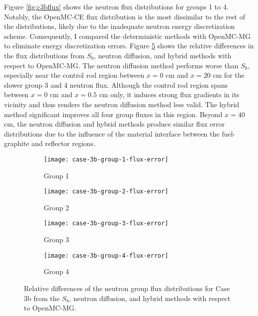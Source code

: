 Figure \ref{fig:c3bflux} shows the neutron flux distributions for groups 1 to 4. Notably, the
OpenMC-CE flux distribution is the most dissimilar to the rest of the distributions, likely due to
the inadequate neutron energy discretization scheme. Consequently, I compared the
deterministic methods with OpenMC-MG to eliminate energy discretization errors. Figure
\ref{fig:c3bfluxe} shows the relative differences in the flux distributions from $S_8$, neutron
diffusion, and hybrid methods with respect to OpenMC-MG. The neutron diffusion method
performs worse than $S_8$, especially near the control rod region between $x=0$ cm and $x=20$ cm
for the slower group 3 and 4 neutron flux. Although the control rod region spans between $x=0$ cm
and $x=0.5$ cm only, it induces strong flux gradients in its vicinity and thus renders the neutron
diffusion method less valid. The hybrid method significant improves all four
group fluxes in this region. Beyond $x=40$ cm, the neutron diffusion and hybrid methods produce
similar flux error distributions due to the influence of the material interface between the
fuel-graphite and reflector regions.

\begin{figure}[htb!]
  \centering
  \begin{subfigure}[t]{.49\textwidth}
    \centering
    \texttt{[image: case-3b-group-1-flux-error]}
    \caption{Group 1}
    \label{fig:c3bg1e}
  \end{subfigure}
  \hfill
  \begin{subfigure}[t]{.49\textwidth}
    \centering
    \texttt{[image: case-3b-group-2-flux-error]}
    \caption{Group 2}
    \label{fig:c3bg2e}
  \end{subfigure}
  \begin{subfigure}[t]{.49\textwidth}
    \centering
    \texttt{[image: case-3b-group-3-flux-error]}
    \caption{Group 3}
    \label{fig:c3bg3e}
  \end{subfigure}
  \hfill
  \begin{subfigure}[t]{.49\textwidth}
    \centering
    \texttt{[image: case-3b-group-4-flux-error]}
    \caption{Group 4}
    \label{fig:c3bg4e}
  \end{subfigure}
  \caption{Relative differences of the neutron group flux distributions for Case 3b from the $S_8$,
    neutron diffusion, and hybrid methods with respect to OpenMC-MG.}
  \label{fig:c3bfluxe}
\end{figure}

